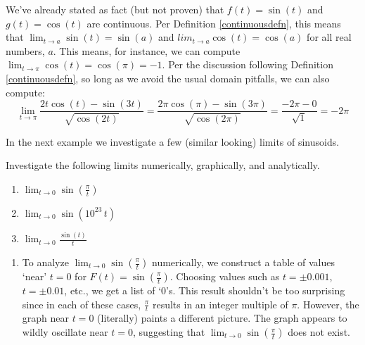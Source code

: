 \documentclass{ximera}
\begin{document}
We've already stated as fact (but not proven) that $f(t) = \sin(t)$ and $g(t) = \cos(t)$ are continuous.  Per Definition \ref{continuousdefn}, this means that $\lim_{t \rightarrow a} \sin(t) = \sin(a)$ and $lim_{t \rightarrow a} \cos(t) = \cos(a)$ for all real numbers, $a$.  This means, for instance, we can compute  $\lim_{t \rightarrow \pi} \cos(t) = \cos(\pi) = -1$.  Per the discussion following Definition \ref{continuousdefn}, so long as we avoid the usual domain pitfalls, we can also compute:
 \[ \lim_{t \rightarrow \pi} \frac{2t \cos(t) - \sin(3t)}{\sqrt{\cos(2t)}} = \frac{2 \pi \cos(\pi) - \sin(3\pi)}{\sqrt{\cos(2\pi)}} = \frac{-2\pi - 0}{\sqrt{1}} = - 2\pi \]
 
 In the next example we investigate a few (similar looking) limits of sinusoids.
 
 
 \begin{example}\label{sinusoidgraphs}  Investigate the following limits numerically, graphically, and analytically.


 \begin{enumerate}
 
 \item $ \lim_{t \rightarrow 0} \sin\left( \frac{\pi}{t} \right)$ 
  \item $\lim_{t \rightarrow 0} \sin\left( 10^{23} \, t \right)$
   \item $\lim_{t \rightarrow 0} \frac{\sin(t)}{t}$
   
   \end{enumerate}

   
\begin{explanation}

\begin{enumerate}

\item   To analyze $\lim_{t \rightarrow 0} \sin\left( \frac{\pi}{t} \right)$ numerically, we construct a table of values `near' $t = 0$ for $F(t) = \sin\left( \frac{\pi}{t} \right)$.  Choosing values such as $t = \pm 0.001$,  $t = \pm 0.01$, etc., we get  a list of `$0$'s. This result shouldn't be too surprising since in each of these cases, $\frac{\pi}{t}$ results in an integer multiple of $\pi$. However, the graph near $t=0$ (literally) paints a different picture.  The graph appears to wildly oscillate near $t=0$, suggesting that  $\lim_{t \rightarrow 0}\sin\left( \frac{\pi}{t} \right)$ does not exist.

\begin{center}
\end{center}
 

\end{enumerate}
\end{explanation}
\end{example}
\end{document}
